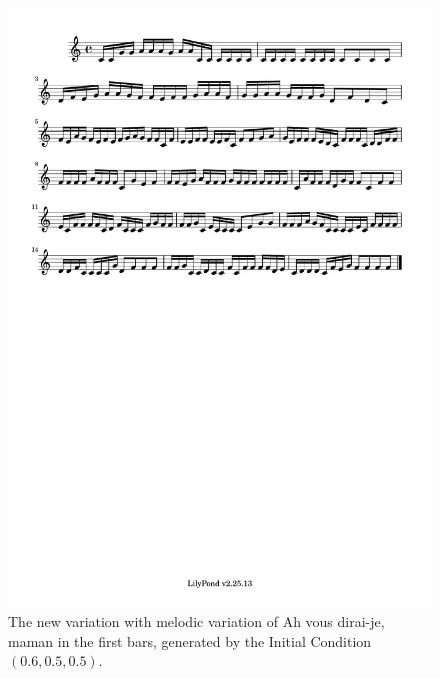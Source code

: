 \documentclass[11pt]{article}
\theoremstyle{definition}
\begin{document}
\begin{figure}
\centering
\includegraphics[trim=1cm 26.5cm 8.65cm 0.5cm, clip, scale=1]{dabby_melody_variation.pdf}
\caption{The new variation with melodic variation of Ah vous dirai-je, maman in the first bars, generated by the Initial Condition $(0.6, 0.5, 0.5)$.} 
\label{fig:DabbyER2}
\end{figure}
\end{document}

